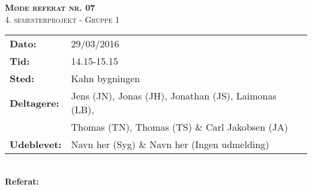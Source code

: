 
\newcommand{\HRule}{\rule{\linewidth}{0.1mm}}


	\begin{center}
		{\huge \bfseries \textsc{Møde referat nr. 07}}\\
		\textsc{\large 4. semesterprojekt - Gruppe 1}\\[0.3cm]
	\end{center}
	\begin{tabular}{ll}
	\large \textbf{Dato:} & 29/03/2016  \\ %
	\large \textbf{Tid:}  & 14.15-15.15 \\ %
	\large \textbf{Sted:} & Kahn bygningen	\\ %
	\large \textbf{Deltagere:} & Jens (JN), Jonas (JH), Jonathan (JS), Laimonas (LB), \\
	\large \textbf & Thomas (TN),  Thomas (TS) \& Carl Jakobsen (JA)\\
	\large \textbf{Udeblevet:} & Navn her (Syg) \& Navn her (Ingen udmelding)	\\
	\end{tabular}\\
	\phantom{\,}\hspace{0.1em} \large \textbf{Referat:}
